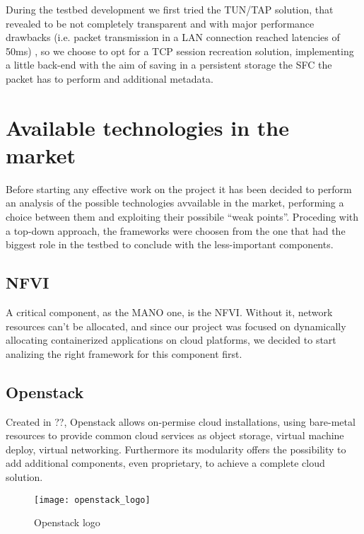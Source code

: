 During the testbed development we first tried the TUN/TAP solution, that
revealed to be not completely transparent and with major performance drawbacks
(i.e. packet transmission in a LAN connection reached latencies of 50ms)
, so we choose to opt for a TCP session recreation solution,
implementing a little back-end with the aim of saving in a persistent storage
the SFC the packet has to perform and additional metadata.

\section{Available technologies in the market}

Before starting any effective work on the project it has been decided to 
perform an analysis of the possible technologies avvailable in the market, 
performing a choice between them and exploiting their possibile ``weak 
points''. Proceding with a top-down approach, the frameworks were choosen from 
the one that had the biggest role in the testbed to conclude with the 
less-important components.

\subsection{NFVI}

A critical component, as the MANO one, is the NFVI. Without it, network 
resources can't be allocated, and since our project was focused on dynamically 
allocating containerized applications on cloud platforms, we decided to start 
analizing the right framework for this component first.

\subsection{Openstack}
\label{chap:prjan:sec:openstack}
Created in ??, Openstack allows
on-permise cloud installations, using bare-metal resources to provide common
cloud services as object storage, virtual machine deploy, virtual networking.
Furthermore its modularity offers the possibility to add additional components,
even proprietary, to achieve a complete cloud solution.
\begin{figure}[t]
 \centering \texttt{[image: openstack\_logo]}
 \caption{Openstack logo}
 \label{chap:prjan:img:openstack_logo}
\end{figure}



